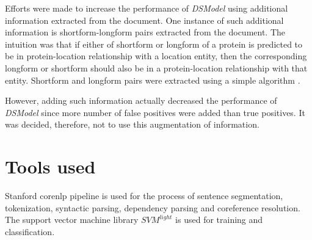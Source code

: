 Efforts were made to increase the performance of \textit{DSModel} using additional information extracted from the document. One instance of such additional information is shortform-longform pairs extracted from the document. The intuition was that if either of shortform or longform of a protein is predicted to be in protein-location relationship with a location entity, then the corresponding longform or shortform should also be in a protein-location relationship with that entity. Shortform and longform pairs were extracted using a simple algorithm \cite{hearst2003simple}.

However, adding such information actually decreased the performance of \textit{DSModel} since more number of false positives were added than true positives. It was decided, therefore, not to use this augmentation of information.

\section{Tools used}\label{sec:tools}

Stanford corenlp pipeline \cite{manning2014stanford} is used for the process of sentence segmentation, tokenization, syntactic parsing, dependency parsing and coreference resolution. The support vector machine library $SVM^{light}$ \cite{joachims1999making} is used for training and classification.
